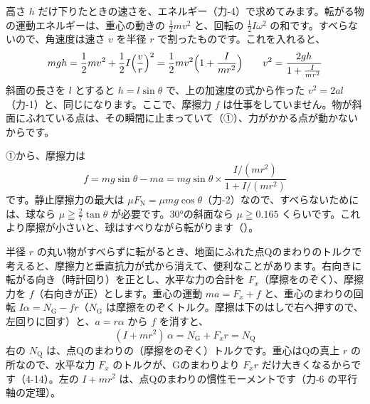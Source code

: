 高さ $h$ だけ下りたときの速さを、エネルギー（力-4）で求めてみます。転がる物の運動エネルギーは、重心の動きの $\tfrac{1}{2}mv^2$ と、回転の $\tfrac{1}{2}I\omega^2$ の和です。すべらないので、角速度は速さ $v$ を半径 $r$ で割ったものです。これを入れると、
\[mgh=\frac{1}{2}mv^2+\frac{1}{2}I\Bigl(\frac{v}{r}\Bigr)^2=\frac{1}{2}mv^2\Bigl(1+\frac{I}{mr^2}\Bigr)\qquad v^2=\frac{2gh}{1+\frac{I}{mr^2}}\]
斜面の長さを $l$ とすると $h=l\sin\theta$ で、上の加速度の式から作った $v^2=2al$（力-1）と、同じになります。ここで、摩擦力 $f$ は仕事をしていません。物が斜面にふれている点は、その瞬間に止まっていて（①）、力がかかる点が動かないからです。

①から、摩擦力は
\[ f=mg\sin\theta-ma=mg\sin\theta\times\frac{I/(mr^2)}{1+I/(mr^2)} \]
です。静止摩擦力の最大は $\mu F_{\mathrm N}=\mu mg\cos\theta$（力-2）なので、すべらないためには、球なら $\mu\geqq\tfrac{2}{7}\tan\theta$ が必要です。\ang{30}の斜面なら $\mu\geqq0.165$ くらいです。これより摩擦が小さいと、球はすべりながら転がります（）。

\begin{phflow}[転がる物]
\end{phflow}

\leavevmode\label{ph:力-7:sec5c}半径 $r$ の丸い物がすべらずに転がるとき、地面にふれた点Qのまわりのトルクで考えると、摩擦力と垂直抗力が式から消えて、便利なことがあります。右向きに転がる向き（時計回り）を正とし、水平な力の合計を $F_x$（摩擦をのぞく）、摩擦力を $f$（右向きが正）とします。重心の運動 $ma=F_x+f$ と、重心のまわりの回転 $I\alpha=N_\mathrm{G}-fr$（$N_\mathrm{G}$ は摩擦をのぞくトルク。摩擦は下のはしで右へ押すので、左回りに回す）と、$a=r\alpha$ から $f$ を消すと、
\[(I+mr^2)\,\alpha=N_\mathrm{G}+F_xr=N_\mathrm{Q}\]
右の $N_\mathrm{Q}$ は、点Qのまわりの（摩擦をのぞく）トルクです。重心はQの真上 $r$ の所なので、水平な力 $F_x$ のトルクが、Gのまわりより $F_xr$ だけ大きくなるからです（4-14）。左の $I+mr^2$ は、点Qのまわりの慣性モーメントです（力-6 の平行軸の定理）。

